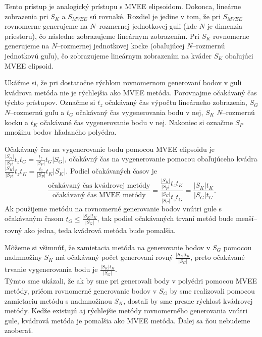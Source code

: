 Tento prístup je analogický prístupu s MVEE elipsoidom. Dokonca, lineárne zobrazenia pri $S_K$ a $S_{MVEE}$ sú rovnaké. Rozdiel je jedine v tom, že pri $S_{MVEE}$ rovnomerne generujeme na $N$--rozmernej jednotkovej guli (kde $N$ je dimenzia priestoru), čo následne zobrazujeme lineárnym zobrazením. Pri $S_K$ rovnomerne generujeme na $N$--rozmernej jednotkovej kocke (obaľujúcej $N$--rozmernú jednotkovú guľu), čo zobrazujeme lineárnym zobrazením na kváder $S_K$ obaľujúci MVEE elipsoid.

Ukážme si, že pri dostatočne rýchlom rovnomernom generovaní bodov v guli kvádrova metóda nie je rýchlejšia ako MVEE metóda. Porovnajme očakávaný čas týchto prístupov. Označme si $t_z$ očakávaný čas výpočtu lineárneho zobrazenia, $S_G$ $N$--rozmernú guľu a $t_G$ očakávaný čas vygenerovania bodu v nej, $S_K$ $N$--rozmernú kocku a $t_K$ očakávané čas vygenerovanie bodu v nej. Nakoniec si označme $S_P$ množinu bodov hľadaného polyédra.

Očakávaný čas na vygenerovanie bodu pomocou MVEE elipsoidu je $\frac{|S_G|}{|S_P|}t_zt_G=\frac{t_z}{|S_P|}t_G|S_G|$, očakávný čas na vygenerovanie pomocou obaľujúceho kvádra $\frac{|S_K|}{|S_P|}t_zt_K=\frac{t_z}{|S_P|}t_K|S_K|$.
Podiel očakávaných časov je $$\frac{\text{očakávaný čas kvádrovej metódy}}{\text{očakávaný čas MVEE metódy}}=\frac{\frac{|S_K|}{|S_P|}t_zt_K}{\frac{|S_G|}{|S_P|}t_zt_G}=\frac{|S_K|t_K}{|S_G|t_G}.$$ Ak použijeme metódu na rovnomerné generovanie bodov vnútri gule s očakávaným časom $t_G \le \frac{|S_K|t_K}{|S_G|}$, tak podiel očakávaných trvaní metód bude menší--rovný ako jedna, teda kvádrová metóda bude pomalšia.

Môžeme si všimnúť, že zamietacia metóda na generovanie bodov v $S_G$ pomocou nadmnožiny $S_K$ má očakávaný počet generovaní rovný $\frac{|S_K|t_K}{|S_G|}$, preto očakávané trvanie vygenerovania bodu je $\frac{|S_K|t_K}{|S_G|}$.\\

Týmto sme ukázali, že ak by sme pri generovali body v polyédri pomocou MVEE metódy, pričom rovnomerné generovanie bodov v $S_G$ by sme realizovali pomocou zamietaciu metódu s nadmnožinou $S_K$, dostali by sme presne rýchlosť kvádrovej metódy. Kedže existujú aj rýchlejšie metódy rovnomerného generovania vnútri gule, kvádrová metóda je pomalšia ako MVEE metóda. Ďalej sa ňou nebudeme zaoberať.\\




